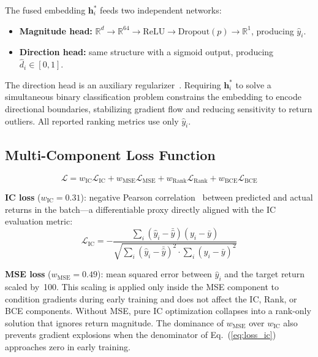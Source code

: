 \documentclass[journal]{IEEEtran}
\begin{document}
The fused embedding $\mathbf{h}_i^*$ feeds two independent networks:
\begin{itemize}
  \item \textbf{Magnitude head:} $\mathbb{R}^d\to\mathbb{R}^{64}\to
    \mathrm{ReLU}\to\mathrm{Dropout}(p)\to\mathbb{R}^1$,
    producing $\hat{y}_i$.
  \item \textbf{Direction head:} same structure with a sigmoid output,
    producing $\hat{d}_i\in[0,1]$.
\end{itemize}
The direction head is an auxiliary regularizer~\cite{caruana1997multitask}.
Requiring $\mathbf{h}_i^*$ to solve a simultaneous binary
classification problem constrains the embedding to encode directional
boundaries, stabilizing gradient flow and reducing sensitivity to
return outliers. All reported ranking metrics use only $\hat{y}_i$.

\subsection{Multi-Component Loss Function}
\label{sec:loss}

\begin{equation}
  \mathcal{L} = w_{\mathrm{IC}}\mathcal{L}_{\mathrm{IC}}
              + w_{\mathrm{MSE}}\mathcal{L}_{\mathrm{MSE}}
              + w_{\mathrm{Rank}}\mathcal{L}_{\mathrm{Rank}}
              + w_{\mathrm{BCE}}\mathcal{L}_{\mathrm{BCE}}
  \label{eq:total_loss}
\end{equation}

\textbf{IC loss} ($w_{\mathrm{IC}}=0.31$): negative Pearson
correlation~\cite{pearson1895notes} between predicted and actual returns
in the batch---a differentiable proxy directly aligned with the IC
evaluation metric:
\begin{equation}
  \mathcal{L}_{\mathrm{IC}} = -\frac{
    \sum_i(\hat{y}_i-\bar{\hat{y}})(y_i-\bar{y})}{
    \sqrt{\sum_i(\hat{y}_i-\bar{\hat{y}})^2\cdot
          \sum_i(y_i-\bar{y})^2}}
  \label{eq:loss_ic}
\end{equation}

\textbf{MSE loss} ($w_{\mathrm{MSE}}=0.49$): mean squared error between
$\hat{y}_i$ and the target return scaled by~100. This scaling is applied
only inside the MSE component to condition gradients during early
training and does not affect the IC, Rank, or BCE components. Without
MSE, pure IC optimization collapses into a rank-only solution that
ignores return magnitude. The dominance of $w_{\mathrm{MSE}}$ over
$w_{\mathrm{IC}}$ also prevents gradient explosions when the denominator
of Eq.~(\ref{eq:loss_ic}) approaches zero in early training.
\end{document}
